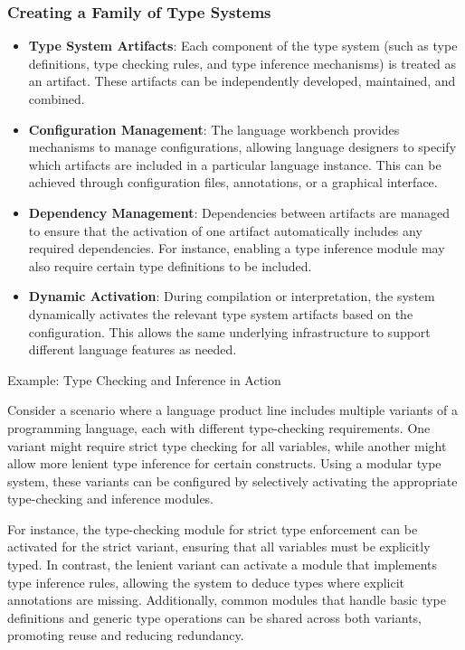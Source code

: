 \subsubsection{Creating a Family of Type Systems}

\begin{itemize}
    \item \textbf{Type System Artifacts}: Each component of the type system (such as type definitions, type checking rules, and type inference mechanisms) is treated as an artifact. These artifacts can be independently developed, maintained, and combined.
    \item \textbf{Configuration Management}: The language workbench provides mechanisms to manage configurations, allowing language designers to specify which artifacts are included in a particular language instance. This can be achieved through configuration files, annotations, or a graphical interface.
    \item \textbf{Dependency Management}: Dependencies between artifacts are managed to ensure that the activation of one artifact automatically includes any required dependencies. For instance, enabling a type inference module may also require certain type definitions to be included.
    \item \textbf{Dynamic Activation}: During compilation or interpretation, the system dynamically activates the relevant type system artifacts based on the configuration. This allows the same underlying infrastructure to support different language features as needed.
\end{itemize}

\noindent Example: Type Checking and Inference in Action

Consider a scenario where a language product line includes multiple variants of a programming language, each with different type-checking requirements. One variant might require strict type checking for all variables, while another might allow more lenient type inference for certain constructs. Using a modular type system, these variants can be configured by selectively activating the appropriate type-checking and inference modules.

For instance, the type-checking module for strict type enforcement can be activated for the strict variant, ensuring that all variables must be explicitly typed. In contrast, the lenient variant can activate a module that implements type inference rules, allowing the system to deduce types where explicit annotations are missing. Additionally, common modules that handle basic type definitions and generic type operations can be shared across both variants, promoting reuse and reducing redundancy.



